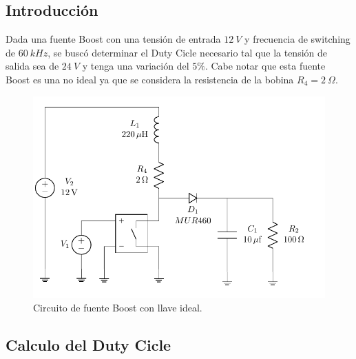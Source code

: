



\subsection{Introducción}

Dada una fuente Boost con una tensión de entrada $12 \ V$ y frecuencia de switching de $60 \ kHz$, se buscó determinar el Duty Cicle necesario tal que la tensión de salida sea de $24 \ V$ y tenga una variación del $5\%$. Cabe notar que esta fuente Boost es una no ideal ya que se considera la resistencia de la bobina $R_4 = 2 \ \Omega$.

\begin{figure}[H]
	\centering
	\includegraphics[width=0.7\linewidth, page=1]{ImagenesEjercicio-2/CircuitsEj2}
	\caption{Circuito de fuente Boost con llave ideal.}
	\label{fig:ej2:circuito}
\end{figure}

\subsection{Calculo del Duty Cicle}

%

